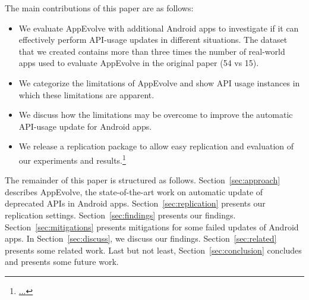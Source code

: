 The main contributions of this paper are as follows:
\begin{itemize}
	\item We  evaluate AppEvolve with additional Android apps to investigate if it can effectively perform API-usage updates in different situations. The dataset that we created contains more than three times the number of real-world apps used to evaluate AppEvolve in the original paper (54 vs 15).
	\item We categorize the limitations of AppEvolve and show API usage instances in which these limitations are apparent.
	\item We discuss how the limitations may be overcome to improve the automatic API-usage update for Android apps.
	\item We release a replication package to allow easy replication and evaluation of our experiments and results.\footnote{\url{...}}
\end{itemize}

The remainder of this paper is structured as follows. Section~\ref{sec:approach} describes AppEvolve, the state-of-the-art work on automatic update of deprecated APIs in Android apps. Section~\ref{sec:replication} presents our replication settings. Section~\ref{sec:findings} presents our findings. Section~\ref{sec:mitigations} presents mitigations for some failed updates of Android apps. In Section~\ref{sec:discuss}, we discuss our findings. Section~\ref{sec:related} presents some related work. Last but not least, Section~\ref{sec:conclusion} concludes and presents some future work.